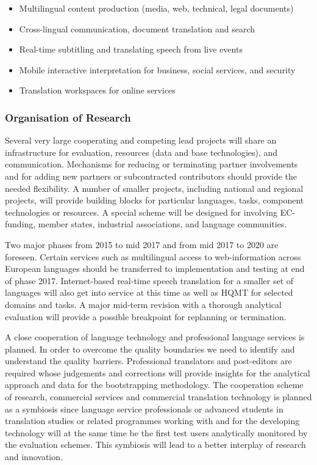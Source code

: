 \documentclass[10pt, plain]{../../metanetpaper}
\begin{document}
\begin{multicols}{2}
\begin{itemize}
\item Multilingual content production (media, web, technical, legal documents)
\item Cross-lingual communication, document translation and search
\item Real-time subtitling and translating speech from live events
\item Mobile interactive interpretation for business, social services, and security
\item Translation workspaces for online services
\end{itemize}

\subsubsection{Organisation of Research}
\label{sec:organ-rese-pt1}

Several very large cooperating and competing lead projects will share an infrastructure for evaluation, resources (data and base technologies), and communication. Mechanisms for reducing or terminating partner involvements and for adding new partners or subcontracted contributors should provide the needed flexibility. A number of smaller projects, including national and regional projects, will provide building blocks for particular languages, tasks, component technologies or resources. A special scheme will be designed for involving EC-funding, member states, industrial associations, and language communities.
 
Two major phases from 2015 to mid 2017 and from mid 2017 to 2020 are foreseen. Certain services such as multilingual access to web-information across European languages should be transferred to implementation and testing at end of phase 2017. Internet-based real-time speech translation for a smaller set of languages will also get into service at this time as well as HQMT for selected domains and tasks. A major mid-term revision with a thorough analytical evaluation will provide a possible breakpoint for replanning or termination.
 
A close cooperation of language technology and professional language services is planned. In order to overcome the quality boundaries we need to identify and understand the quality barriers. Professional translators and post-editors are required whose judgements and corrections will provide insights for the analytical approach and data for the bootstrapping methodology. The cooperation scheme of research, commercial services and commercial translation technology is planned as a symbiosis since language service professionals or advanced students in translation studies or related programmes working with and for the developing technology will at the same time be the first test users analytically monitored by the evaluation schemes. This symbiosis will lead to a better interplay of research and innovation.


\end{multicols}
\end{document}
